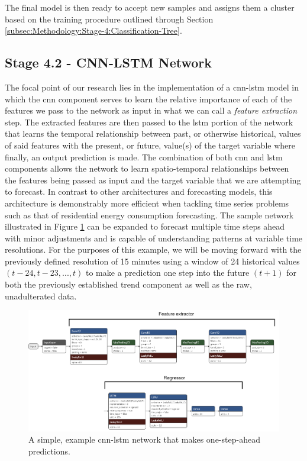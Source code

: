\noindent \newline The final model is then ready to accept new samples and assigns them a cluster based on the training procedure outlined through Section \ref{subsec:Methodology:Stage-4:Classification-Tree}.

\subsection{Stage 4.2 - CNN-LSTM Network}
\label{subsec:Methodology:Stage-4:CNN-LSTM-Network}
The focal point of our research lies in the implementation of  a \gls{cnn-lstm} model in which the \gls{cnn} component serves to learn the relative importance of each of the features we pass to the network as input in what we can call a \textit{feature extraction} step. The extracted features are then passed to the \gls{lstm} portion of the network that learns the temporal relationship between past, or otherwise historical, values of said features with the present, or future, value(s) of the target variable where finally, an output prediction is made. The combination of both \gls{cnn} and \gls{lstm} components allows the network to learn spatio-temporal relationships between the features being passed as input and the target variable that we are attempting to forecast. In contrast to other architectures and forecasting models, this architecture is demonstrably more efficient \cite{Kim} when tackling time series problems such as that of residential energy consumption forecasting. The sample network illustrated in Figure \ref{fig:UCID-CNN-LSTM-Model} can be expanded to forecast multiple time steps ahead with minor adjustments and is capable of understanding patterns at variable time resolutions. For the purposes of this example, we will be moving forward with the previously defined resolution of 15 minutes using a window of 24 historical values $(t - 24, t - 23, ..., t)$ to make a prediction one step into the future $(t + 1)$ for both the previously established trend component as well as the raw, unadulterated data.

\begin{figure}[hbt!]
    \begin{adjustwidth}{-1.5cm}{-1.5cm}%
        \centering
        \includegraphics[width=\linewidth]{Images/Chapter 5/Stage 4/UCID/UCID-CNN-LSTM-Model-2.pdf}
        \caption{A simple, example \gls{cnn-lstm} network that makes one-step-ahead predictions.}
        \label{fig:UCID-CNN-LSTM-Model}
    \end{adjustwidth}
\end{figure}

